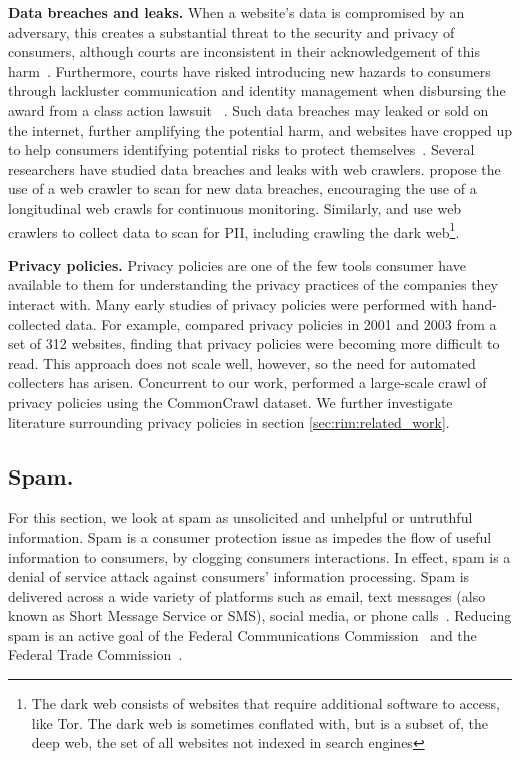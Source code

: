 \textbf{Data breaches and leaks.}
When a website's data is compromised by an adversary, this creates a substantial threat to the security and privacy of consumers, although courts are inconsistent in their acknowledgement of this harm~\cite{solove2017risk}. Furthermore, courts have risked introducing new hazards to consumers through lackluster communication and identity management when disbursing the award from a class action lawsuit~\cite{amos2019enhancing} . Such data breaches may leaked or sold on the internet, further amplifying the potential harm, and websites have cropped up to help consumers identifying potential risks to protect themselves~\cite{hunt2019have}. Several researchers have studied data breaches and leaks with web crawlers. \citet{trabelsi2019monitoring} propose the use of a web crawler to scan for new data breaches, encouraging the use of a longitudinal web crawls for continuous monitoring. Similarly, \citet{liu2020identifying} and \cite{nazah2021unsupervised} use web crawlers to collect data to scan for PII, including crawling the dark web\footnote{The dark web consists of websites that require additional software to access, like Tor. The dark web is sometimes conflated with, but is a subset of, the deep web, the set of all websites not indexed in search engines}.

\textbf{Privacy policies.} Privacy policies are one of the few tools consumer have available to them for understanding the privacy practices of the companies they interact with. Many early studies of privacy policies were performed with hand-collected data. For example, \citet{milne2006longitudinal} compared privacy policies in 2001 and 2003 from a set of 312 websites, finding that privacy policies were becoming more difficult to read. This approach does not scale well, however, so the need for automated collecters has arisen. Concurrent to our work, \citet{srinath2020} performed a large-scale crawl of privacy policies using the CommonCrawl dataset. We further investigate literature surrounding privacy policies in section \ref{sec:rim:related_work}.


\subsection{Spam.} 
For this section, we look at spam as unsolicited and unhelpful or untruthful information. Spam is a consumer protection issue as impedes the flow of useful information to consumers, by clogging consumers interactions. In effect, spam is a denial of service attack against consumers' information processing. Spam is delivered across a wide variety of platforms such as email, text messages (also known as Short Message Service or SMS), social media, or phone calls~\cite{malwarebytesspam}. Reducing spam is an active goal of the Federal Communications Commission~\cite{fcc2021acting} and the Federal Trade Commission~\cite{ftc2021canspam,ftc21notice}.

